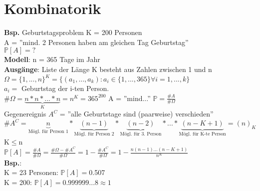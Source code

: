 \chapter{Kombinatorik}
\textbf{Bsp.} Geburtstagsproblem \hspace{1.5cm} K = 200 Personen\\
A = ''mind. 2 Personen haben am gleichen Tag Geburtstag''\\
$\mathds{P}[A] = ?$\medskip\\
\textbf{Modell}: n = 365 Tage im Jahr\\
\textbf{Ausgänge}: Liste der Länge K besteht aus Zahlen zwischen 1 und n\medskip\\
$\Omega = \{1,...,n\}^K=\{(a_1,...,a_k):a_i \in \{1,...,365\}\forall i = 1,...,k\}$\smallskip\\
$a_i = $ Geburtstag der i-ten Person.\\
\#$\Omega =\underbrace{n*n*...*n}_K = n^K = 365^{200}$
A = ''mind...'' \hspace{1.5cm} $\mathds{P} = \frac{\#A}{\#\Omega}$\smallskip\\
Gegenereignis $A^C$ = ''alle Geburtstage sind (paarweise) verschieden''\\
$\#A^C = \underbrace{n}_{\text{Mögl. für Person 1}}*\underbrace{(n-1)}_{\text{Mögl. für Person 2}}*\underbrace{(n-2)}_\text{Mögl. für 3. Person} * ... * \underbrace{(n-K+1)}_\text{Mögl. für K-te Person} = (n)_K$\\K$ \leq  $n\medskip\\
$\mathds{P}[A] = \frac{\#A}{\#\Omega} = \frac{\#\Omega-\#A^C}{\#\Omega}=1-\frac{\#A^C}{\#\Omega}=1-\frac{n(n-1)...(n-K+1)}{n^K}$\medskip\\
\textbf{Bsp.}:\\ K = 23 Personen: $\mathds{P}[A]=$0.507\\K = 200: $\mathds{P}[A]=0.999999...8 \approx 1$\newpage
